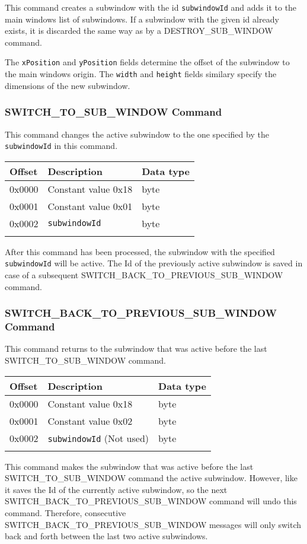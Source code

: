 \documentclass{article}
\newcommand{\field}[1]{\textcolor{fieldColor}{\texttt{#1}}}
\newenvironment{bytelisting}
{\ttfamily \begin{center} \begin{tabular}{l l l} Offset & Description & Data type \\ \hline}
{\normalfont \end{tabular} \end{center}}
\begin{document}
This command creates a subwindow with the id \field{subwindowId} and adds it to the main windows list of subwindows. If a subwindow with the given id already exists, it is discarded 
the same way as by a DESTROY\_SUB\_WINDOW command.

The \field{xPosition} and \field{yPosition} fields determine the offset of the subwindow to the main windows origin. The \field{width} and \field{height} fields similary specify the 
dimensions of the new subwindow.

\subsubsection{SWITCH\_TO\_SUB\_WINDOW Command}
This command changes the active subwindow to the one specified by the \\ \field{subwindowId} in this command.

\begin{bytelisting}
0x0000 & Constant value 0x18 & byte \\
0x0001 & Constant value 0x01 & byte \\
0x0002 & \field{subwindowId} & byte \\
\end{bytelisting}

After this command has been processed, the subwindow with the specified \field{subwindowId} will be active. The Id of the previously active subwindow is saved in case of a subsequent
SWITCH\_BACK\_TO\_PREVIOUS\_SUB\_WINDOW command.

\subsubsection{SWITCH\_BACK\_TO\_PREVIOUS\_SUB\_WINDOW Command}
This command returns to the subwindow that was active before the last \\
SWITCH\_TO\_SUB\_WINDOW command.

\begin{bytelisting}
0x0000 & Constant value 0x18 & byte \\
0x0001 & Constant value 0x02 & byte \\
0x0002 & \field{subwindowId} (Not used) & byte \\
\end{bytelisting}

This command makes the subwindow that was active before the last \\
SWITCH\_TO\_SUB\_WINDOW command the active subwindow. However, like it saves the Id of the currently active subwindow, so the next \\
SWITCH\_BACK\_TO\_PREVIOUS\_SUB\_WINDOW command will undo this command. Therefore, consecutive SWITCH\_BACK\_TO\_PREVIOUS\_SUB\_WINDOW messages will only switch back and forth between the 
last two active subwindows.
\end{document}
